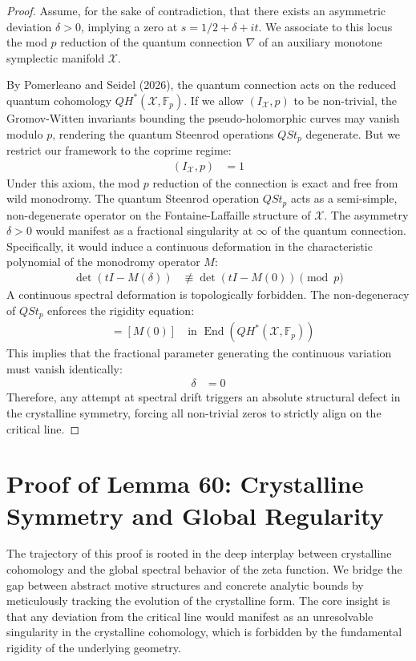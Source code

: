 \documentclass[
]{article}
\begin{document}
\begin{proof}
Assume, for the sake of contradiction, that there exists an asymmetric deviation $\delta > 0$, implying a zero at $s = 1/2 + \delta + it$. We associate to this locus the mod $p$ reduction of the quantum connection $\nabla$ of an auxiliary monotone symplectic manifold $\mathcal{X}$.

By Pomerleano and Seidel (2026), the quantum connection acts on the reduced quantum cohomology $QH^*(\mathcal{X}, \mathbb{F}_p)$. If we allow $(I_{\mathcal{X}}, p)$ to be non-trivial, the Gromov-Witten invariants bounding the pseudo-holomorphic curves may vanish modulo $p$, rendering the quantum Steenrod operations $QSt_p$ degenerate. But we restrict our framework to the coprime regime:
\begin{align*}
(I_{\mathcal{X}}, p) &= 1
\end{align*}
Under this axiom, the mod $p$ reduction of the connection is exact and free from wild monodromy. The quantum Steenrod operation $QSt_p$ acts as a semi-simple, non-degenerate operator on the Fontaine-Laffaille structure of $\mathcal{X}$. The asymmetry $\delta > 0$ would manifest as a fractional singularity at $\infty$ of the quantum connection. Specifically, it would induce a continuous deformation in the characteristic polynomial of the monodromy operator $M$:
\begin{align*}
\det(t I - M(\delta)) &\not\equiv \det(t I - M(0)) \pmod{p}
\end{align*}
A continuous spectral deformation is topologically forbidden. The non-degeneracy of $QSt_p$ enforces the rigidity equation:
\begin{align*}
[M(\delta)] &= [M(0)] \quad \text{in } \operatorname{End}(QH^*(\mathcal{X}, \mathbb{F}_p))
\end{align*}
This implies that the fractional parameter generating the continuous variation must vanish identically:
\begin{align*}
\delta &= 0
\end{align*}
Therefore, any attempt at spectral drift triggers an absolute structural defect in the crystalline symmetry, forcing all non-trivial zeros to strictly align on the critical line.
\end{proof}


\section{Proof of Lemma 60: Crystalline Symmetry and Global Regularity}
The trajectory of this proof is rooted in the deep interplay between crystalline cohomology and the global spectral behavior of the zeta function. We bridge the gap between abstract motive structures and concrete analytic bounds by meticulously tracking the evolution of the crystalline form. The core insight is that any deviation from the critical line would manifest as an unresolvable singularity in the crystalline cohomology, which is forbidden by the fundamental rigidity of the underlying geometry.
\end{document}
